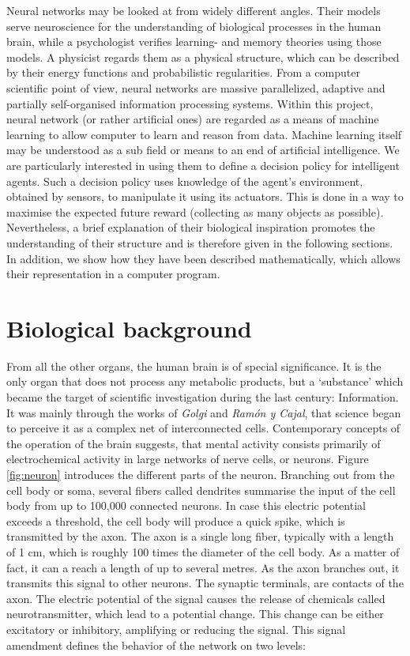\documentclass[10pt,a4paper,DIV=11]{scrreprt}
\begin{document}
Neural networks may be looked at from widely different angles. Their models serve neuroscience for the understanding of biological processes 
in the human brain, while a psychologist verifies learning- and memory theories using those models. A physicist regards them as a physical structure,
which can be described by their energy functions and probabilistic regularities. From a computer scientific point of view, neural networks
are massive parallelized, adaptive and partially self-organised information processing systems. \cite{NNGER}
Within this project, neural network (or rather artificial ones) are regarded as a means of machine learning to allow computer to learn and reason
from data.  Machine learning itself may be understood as a sub field or means to an end of artificial intelligence.
We are particularly interested in using them to define a decision policy for intelligent agents. Such a decision policy uses knowledge of the agent's
environment, obtained by sensors, to manipulate it using its actuators. This is done in a way to maximise the expected future reward (collecting as
many objects as possible). Nevertheless, a brief explanation of their biological inspiration promotes the understanding of their structure and is 
therefore given in the following sections. In addition, we show how they have been described mathematically, which allows their representation 
in a computer program.

\section{Biological background}
From all the other organs, the human brain is of special significance. It is the only organ that does not process any metabolic products, but a 
‘substance’ which became the target of scientific investigation during the last century: Information. It was mainly through the works of 
\textit{Golgi} and \textit{Ramón y Cajal}, that science began to perceive it as a complex net of interconnected cells.  Contemporary 
concepts of the operation of the brain suggests, that mental activity consists primarily of electrochemical activity in large networks of nerve 
cells, or neurons. Figure \ref{fig:neuron} introduces the different parts of the neuron. Branching out from the cell body or soma, several fibers 
called dendrites summarise the input of the cell body from up to 100,000 connected neurons. In case this electric potential exceeds a threshold, 
the cell body will produce a quick spike, which is transmitted by the axon. The axon is a single long fiber, typically with a length of 1 cm,
which is roughly 100 times the diameter of the cell body. As a matter of fact, it can a reach a length of up to several metres. As the axon branches 
out, it transmits this signal to other neurons. The synaptic terminals, are contacts of the axon. The electric potential of the signal causes the 
release of chemicals called neurotransmitter, which lead to a potential change. This change can be either excitatory or inhibitory, amplifying or 
reducing the signal. This signal amendment defines the behavior of the network on two levels: 
\end{document}
